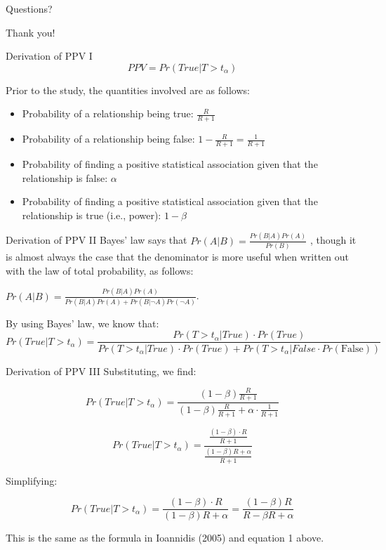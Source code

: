 \documentclass{beamer}
\begin{document}
\begin{frame}
\begin{center}
Questions?
\vspace{1in}


\Huge{Thank you!}
\end{center}
\end{frame}

\begin{frame}[label=derive]{Derivation of PPV I}
\[PPV = Pr(True|T > t_{\alpha})\]

Prior to the study, the quantities involved are as follows:

\begin{itemize}
\item
  Probability of a relationship being true: \(\frac{R}{R + 1}\)
\item
  Probability of a relationship being false:
  \(1 - \frac{R}{R + 1} = \frac{1}{R + 1}\)
\item
  Probability of finding a positive statistical association given that
  the relationship is false: \(\alpha\)
\item
  Probability of finding a positive statistical association given that
  the relationship is true (i.e., power): \(1 - \beta\)
\end{itemize}
\end{frame}

\begin{frame}[label=derive]{Derivation of PPV II}
Bayes' law says that \(Pr(A|B) = \frac{Pr(B|A)Pr(A)}{Pr(B)}\) , though
it is almost always the case that the denominator is more useful when
written out with the law of total probability, as follows:

\(Pr(A|B) = \frac{Pr(B|A)Pr(A)}{Pr(B|A)Pr(A) + Pr(B|\neg A)Pr(\neg A)}\).

By using Bayes' law, we know that:
\tiny{
\[Pr(True|T > t_{\alpha}) = \frac{Pr(T > t_{\alpha}|True) \cdot Pr(True)}{Pr(T > t_{\alpha}|True) \cdot Pr(True) + Pr(T > t_{\alpha}|False \cdot Pr\left( \text{False} \right))}\]}
\end{frame}

\begin{frame}[label=derive]{Derivation of PPV III}
Substituting, we find:

\[Pr(True|T > t_{\alpha}) = \frac{(1 - \beta)\frac{R}{R + 1}}{(1 - \beta)\frac{R}{R + 1} + \alpha \cdot \frac{1}{R + 1}}\]

\[Pr(True|T > t_{\alpha}) = \frac{\frac{(1 - \beta) \cdot R}{R + 1}}{\frac{(1 - \beta)R + \alpha}{R + 1}}\]

Simplifying:

\[Pr(True|T > t_{\alpha}) = \frac{(1 - \beta) \cdot R}{(1 - \beta)R + \alpha} = \frac{(1 - \beta)R}{R - \beta R + \alpha}\]

This is the same as the formula in Ioannidis (2005) and equation 1
above.
\hyperlink{Ioannidis}{}
\end{frame}
\end{document}
